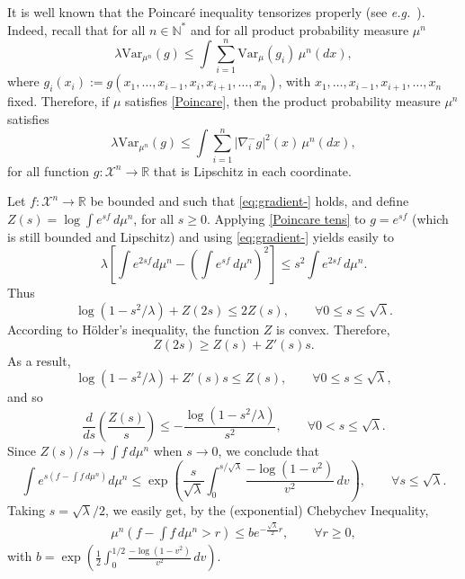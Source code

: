 \documentclass[11pt]{amsart}
\numberwithin{equation}{section}
\begin{document}
\proof
It is well known that the Poincar\'e inequality tensorizes properly (see \textit{e.g.}\ \cite[proposition 5.6]{Ledoux-book}). Indeed, recall that 
  for all $n\in {\mathbb{N}}^*$ and for all product probability measure $\mu^n$
\begin{equation*}\lambda\mathrm{Var}_{\mu^n}(g)\leq \int\sum_{i=1}^n \mathrm{Var}_{\mu}(g_i)\,\mu^n(dx),
\end{equation*}
where  $g_i(x_i):=g(x_1,\ldots,x_{i-1},x_i,x_{i+1},\ldots,x_n)$, with $x_1,\ldots,x_{i-1},x_{i+1},\ldots,x_n$ fixed.
Therefore,  if $\mu$ satisfies \eqref{Poincare}, then the product probability measure $\mu^n$ satisfies
\begin{equation}\label{Poincare tens}
\lambda\mathrm{Var}_{\mu^n}(g)\leq \int\sum_{i=1}^n |\nabla_i^-g|^2(x)\,\mu^n(dx),
\end{equation}
for all function $g:{\mathcal{X}}^n \to {\mathbb{R}}$ that is Lipschitz in each coordinate.

Let $f:{\mathcal{X}}^n\to{\mathbb{R}}$ be bounded and such that \eqref{eq:gradient-} holds, and define $Z(s)=\log \int e^{s f}\,d\mu^n$, for all $s\geq0$. Applying \eqref{Poincare tens} to $g=e^{s f}$ (which is still bounded and Lipschitz) and using \eqref{eq:gradient-} yields easily to
\[
\lambda\left[\int e^{2s f}d\mu^n - \left(\int e^{s f}\,d\mu^n\right)^2\right] \leq s^2\int e^{2sf}\,d\mu^n .
\]
Thus
\[
\log(1-s^2/\lambda) + Z(2s) \leq 2Z(s),\qquad \forall 0\leq s \leq \sqrt{\lambda}.
\]
According to H\"older's inequality, the function $Z$ is convex. Therefore,
\[
Z(2s)\geq Z(s) + Z'(s)s.
\]
As a result,
\[
\log(1-s^2/\lambda) + Z'(s)s \leq Z(s),\qquad \forall 0\leq s \leq \sqrt{\lambda},
\]
and so
\[
\frac{d}{ds}\left( \frac{Z(s)}{s}\right) \leq -\frac{\log(1-s^2/\lambda)}{s^2},\qquad \forall 0< s \leq \sqrt{\lambda}.
\]
Since $Z(s)/s\to \int f\,d\mu^n$ when $s\to0$, we conclude that
\[
\int e^{s(f-\int f\,d\mu^n)}d\mu^n \leq \exp\left(\frac{s}{\sqrt{\lambda}} \int_0^{s/\sqrt{\lambda}} \frac{-\log(1-v^2)}{v^2}\,dv \right),\qquad \forall s\leq \sqrt{\lambda}.
\]
Taking $s=\sqrt{\lambda}/2$, we easily get, by the (exponential) Chebychev Inequality,
\begin{eqnarray}\label{hourra}
\mu^n\left(f-\int f\,d\mu^n >r\right)\leq be^{-\frac{\sqrt{\lambda}}{2}r},\qquad \forall r\geq0,
\end{eqnarray}
with $b=\exp\left( \frac{1}{2}\int_0^{1/2}\frac{-\log(1-v^2)}{v^2}\,dv\right).$
\end{document}
